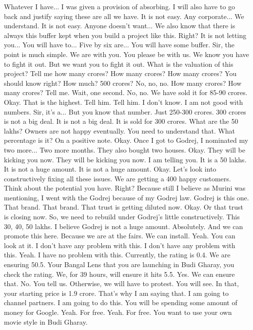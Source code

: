 Whatever I have...
I was given a provision of absorbing.
I will also have to go back and justify saying these are all we have.
It is not easy.
Any corporate...
We understand.
It is not easy.
Anyone doesn't want...
We also know that there is always this buffer kept when you build a project like this.
Right?
It is not letting you...
You will have to...
Five by six are...
You will have some buffer.
Sir, the point is much simple.
We are with you.
You please be with us.
We know you have to fight it out.
But we want you to fight it out.
What is the valuation of this project?
Tell me how many crores?
How many crores?
How many crores?
You should know right?
How much?
500 crores?
No, no, no.
How many crores?
How many crores?
Tell me.
Wait, one second.
No, no.
We have sold it for 85-90 crores.
Okay.
That is the highest.
Tell him.
Tell him.
I don't know.
I am not good with numbers.
Sir, it's a...
But you know that number.
Just 250-300 crores.
300 crores is not a big deal.
It is not a big deal.
It is sold for 300 crores.
What are the 50 lakhs?
Owners are not happy eventually.
You need to understand that.
What percentage is it?
On a positive note.
Okay.
Once I got to Godrej,
I nominated my two more...
Two more months.
They also bought two houses.
Okay.
They will be kicking you now.
They will be kicking you now.
I am telling you.
It is a 50 lakhs.
It is not a huge amount.
It is not a huge amount.
Okay.
Let's look into constructively fixing all these issues.
We are getting a 400 happy customers.
Think about the potential you have.
Right?
Because still I believe as Murini was mentioning,
I went with the Godrej because of my Godrej law.
Godrej is this one.
That brand.
That brand.
That trust is getting diluted now.
Okay.
Or that trust is closing now.
So, we need to rebuild under Godrej's little constructively.
This 30, 40, 50 lakhs.
I believe Godrej is not a huge amount.
Absolutely.
And we can promote this here.
Because we are at the fairs.
We can install.
Yeah.
You can look at it.
I don't have any problem with this.
I don't have any problem with this.
Yeah.
I have no problem with this.
Currently, the rating is 0.4.
We are ensuring 50.5.
Your Bangal Lens that you are launching in Budi Gharay,
you check the rating.
We, for 39 hours,
will ensure it hits 5.5.
Yes.
We can ensure that.
No.
You tell us.
Otherwise, we will have to protest.
You will see.
In that, your starting price is 1.9 crore.
That's why I am saying that.
I am going to channel partners.
I am going to do this.
You will be spending some amount of money for Google.
Yeah.
For free.
Yeah.
For free.
You want to use your own movie style in Budi Gharay.

